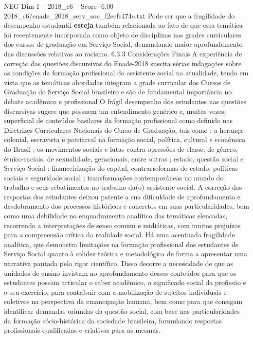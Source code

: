 \begin{textsample}{NEG Dim 1 – 2018\_c6 – Score -6.00 – 2018\_c6/enade\_2018\_serv\_soc\_f2ecfc474e.txt}
Pode ser que a fragilidade do desempenho estudantil \textbf{esteja} também relacionada ao fato de que essa temática foi recentemente incorporada como objeto de disciplinas nas grades curriculares dos cursos de graduação em Serviço Social, demandando maior aprofundamento das discussões relativas ao racismo. 6.3.3 Considerações Finais A experiência de correção das questões discursivas do Enade-2018 suscita sérias indagações sobre as condições da formação profissional do assistente social na atualidade, tendo em vista que as temáticas abordadas integram a grade curricular dos Cursos de Graduação do Serviço Social brasileiro e são de fundamental importância no debate acadêmico e profissional O frágil desempenho dos estudantes nas questões discursivas sugere que possuem um entendimento genérico e, muitas vezes, superficial de conteúdos basilares da formação profissional como definido nas Diretrizes Curriculares Nacionais do Curso de Graduação, tais como : a herança colonial, escravista e patriarcal na formação social, política, cultural e econômica do Brasil ; os movimentos sociais e lutas contra opressões de classe, de gênero, étnico-raciais, de sexualidade, geracionais, entre outras ; estado, questão social e Serviço Social : financeirização do capital, contrarreformas do estado, políticas sociais e seguridade social ; transformações contemporâneas no mundo do trabalho e seus rebatimentos no trabalho da(o) assistente social.
A correção das respostas dos estudantes deixou patente a sua dificuldade de aprofundamento e desdobramento dos processos históricos e concretos em suas particularidades, bem como uma debilidade no enquadramento analítico das temáticas elencadas, recorrendo a interpretações de senso comum e midiáticas, com muitos prejuízos para a compreensão crítica da realidade social.
Há uma acentuada fragilidade analítica, que demonstra limitações na formação profissional dos estudantes de Serviço Social quanto à solidez teórica e metodológica de forma a apresentar uma narrativa pautada pelo rigor científico.
Disso decorre a necessidade de que as unidades de ensino invistam no aprofundamento desses conteúdos para que os estudantes possam articular o saber acadêmico, o significado social da profissão e o seu exercício, para contribuir com a mobilização de sujeitos individuais e coletivos na perspectiva da emancipação humana, bem como para que consigam identificar demandas oriundas da questão social, com base nas particularidades da formação sócio-histórica da sociedade brasileira, formulando respostas profissionais qualificadas e criativas para as mesmas.

\end{textsample}
